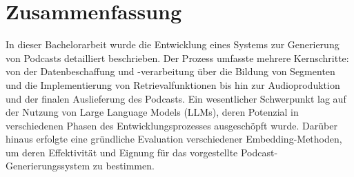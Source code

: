 \chapter{Zusammenfassung}\label{ch:summary}

In dieser Bachelorarbeit wurde die Entwicklung eines Systems zur Generierung von Podcasts detailliert beschrieben. Der Prozess umfasste mehrere Kernschritte: von der Datenbeschaffung und -verarbeitung über die Bildung von Segmenten und die Implementierung von Retrievalfunktionen bis hin zur Audioproduktion und der finalen Auslieferung des Podcasts. Ein wesentlicher Schwerpunkt lag auf der Nutzung von Large Language Models (LLMs), deren Potenzial in verschiedenen Phasen des Entwicklungsprozesses ausgeschöpft wurde. Darüber hinaus erfolgte eine gründliche Evaluation verschiedener Embedding-Methoden, um deren Effektivität und Eignung für das vorgestellte Podcast-Generierungssystem zu bestimmen.